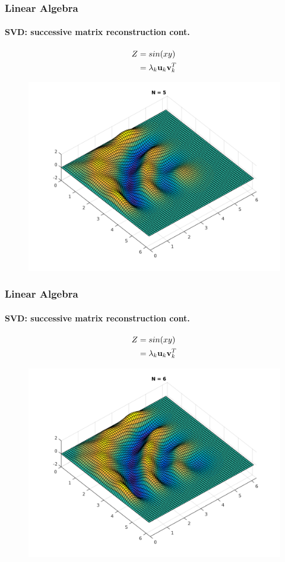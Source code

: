 \documentclass[hyperref={pdfpagelabels=true}]{beamer}
\begin{document}
\begin{frame}
\frametitle{Linear Algebra}
\framesubtitle{SVD: successive matrix reconstruction {\tiny cont.}} 
\small{
\begin{center}
\begin{align*}
Z &= sin(xy) \\
  &= \lambda_k{\bf u}_k {\bf v}_k^T
\end{align*}
\end{center}}
\begin{figure}[!htb]
\centering
\includegraphics [scale=0.415]{as/a5.png}
\end{figure}
\end{frame}

\begin{frame}
\frametitle{Linear Algebra}
\framesubtitle{SVD: successive matrix reconstruction {\tiny cont.}} 
\small{
\begin{center}
\begin{align*}
Z &= sin(xy) \\
  &= \lambda_k{\bf u}_k {\bf v}_k^T
\end{align*}
\end{center}}
\begin{figure}[!htb]
\centering
\includegraphics [scale=0.415]{as/a6.png}
\end{figure}
\end{frame}
\end{document}
